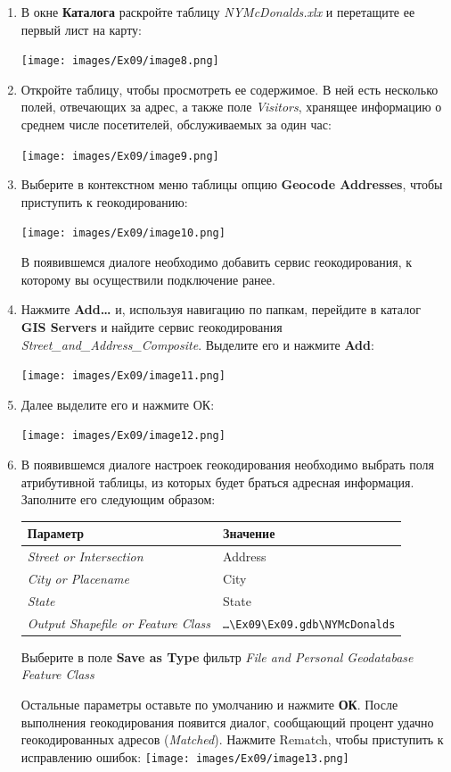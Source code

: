 \documentclass[12pt,]{book}
\begin{document}
\begin{enumerate}
\def\labelenumi{\arabic{enumi}.}
\item
  В окне \textbf{Каталога} раскройте таблицу \emph{NYMcDonalds.xlx} и перетащите ее первый лист на карту:

  \texttt{[image: images/Ex09/image8.png]}
\item
  Откройте таблицу, чтобы просмотреть ее содержимое. В ней есть несколько полей, отвечающих за адрес, а также поле \emph{Visitors}, хранящее информацию о среднем числе посетителей, обслуживаемых за один час:

  \texttt{[image: images/Ex09/image9.png]}
\item
  Выберите в контекстном меню таблицы опцию \textbf{Geocode Addresses}, чтобы приступить к геокодированию:

  \texttt{[image: images/Ex09/image10.png]}

  В появившемся диалоге необходимо добавить сервис геокодирования, к которому вы осуществили подключение ранее.
\item
  Нажмите \textbf{Add\ldots{}} и, используя навигацию по папкам, перейдите в каталог \textbf{GIS Servers} и найдите сервис геокодирования \emph{Street\_and\_Address\_Composite}. Выделите его и нажмите \textbf{Add}:

  \texttt{[image: images/Ex09/image11.png]}
\item
  Далее выделите его и нажмите ОК:

  \texttt{[image: images/Ex09/image12.png]}
\item
  В появившемся диалоге настроек геокодирования необходимо выбрать поля атрибутивной таблицы, из которых будет браться адресная информация. Заполните его следующим образом:

  \begin{longtable}[]{@{}ll@{}}
  \toprule
  Параметр & Значение\tabularnewline
  \midrule
  \endhead
  \emph{Street or Intersection} & Address\tabularnewline
  \emph{City or Placename} & City\tabularnewline
  \emph{State} & State\tabularnewline
  \emph{Output Shapefile or Feature Class} & \texttt{\ldots{}\textbackslash{}Ex09\textbackslash{}Ex09.gdb\textbackslash{}NYMcDonalds}\tabularnewline
  \bottomrule
  \end{longtable}

  Выберите в поле \textbf{Save as Type} фильтр \emph{File and Personal Geodatabase Feature Class}

  Остальные параметры оставьте по умолчанию и нажмите \textbf{ОК}. После выполнения геокодирования появится диалог, сообщающий процент удачно геокодированных адресов (\emph{Matched}). Нажмите Rematch, чтобы приступить к исправлению ошибок: \texttt{[image: images/Ex09/image13.png]}


\end{enumerate}
\end{document}
